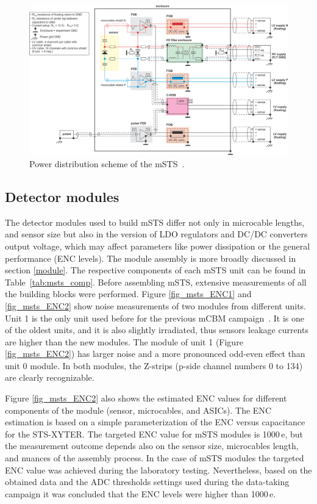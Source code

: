 \begin{figure}[!h]
\centering
\includegraphics[width=0.95\columnwidth]{Chapter6/DCS/images/power_distribution.png}
\caption{Power distribution scheme of the \gls{mSTS}~\cite{Lymanets}.}
\label{fig_msts_power}
\end{figure}

\subsection{Detector modules}
 The detector modules used to build \gls{mSTS} differ not only in microcable lengths, and sensor size but also in the version of \gls{LDO} regulators and DC/DC converters output voltage, which may affect parameters like power dissipation or the general performance (ENC levels). The module assembly is more broadly discussed in section \ref{module}. The respective components of each \gls{mSTS} unit can be found in Table~\ref{tab:msts_comp}. Before assembling \gls{mSTS}, extensive measurements of all the building blocks were performed. Figure \ref{fig_msts_ENC1} and  \ref{fig_msts_ENC2} show noise measurements of two modules from different units. Unit 1 is the only unit used before for the previous \gls{mCBM} campaign~\cite{heuser1}. It is one of the oldest units, and it is also slightly irradiated, thus sensors leakage currents are higher than the new modules. The module of unit 1 (Figure \ref{fig_msts_ENC2}) has larger noise and a more pronounced odd-even effect than unit 0 module. In both modules, the Z-strips (p-side channel numbers 0 to 134) are clearly recognizable. 

Figure \ref{fig_msts_ENC2} also shows the estimated ENC values for different components of the module (sensor, microcables, and \gls{ASIC}s). The \gls{ENC} estimation is based on a simple parameterization of the \gls{ENC} versus capacitance for the STS-XYTER. The targeted \gls{ENC} value for \gls{mSTS} modules is 1000\,e, but the measurement outcome depends also on the sensor size, microcables length, and nuances of the assembly process. In the case of \gls{mSTS} modules the targeted \gls{ENC} value was achieved during the laboratory testing. Nevertheless, based on the  obtained data and the \gls{ADC} thresholds settings used during the data-taking campaign it was concluded that the \gls{ENC} levels were higher than 1000\,e.


